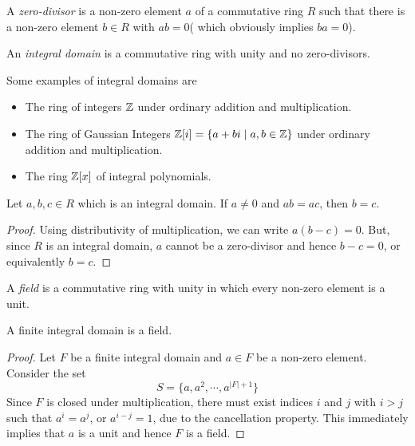 \begin{definition}
	A \textit{zero-divisor} is a non-zero element $a$ of a commutative ring $R$ such that there is a non-zero element $b\in R$ with $ab=0$( which obviously implies $ba=0$).
\end{definition}

\begin{definition}
	An \textit{integral domain} is a commutative ring with unity and no zero-divisors.
\end{definition}

Some examples of integral domains are
\begin{itemize}
	\item The ring of integers $\mathbb{Z}$ under ordinary addition and multiplication.
	\item The ring of Gaussian Integers $\mathbb{Z}[i] = \{a+bi\mid a,b\in\mathbb{Z}\}$ under ordinary addition and multiplication.
	\item The ring $\mathbb{Z}[x]$ of integral polynomials.
\end{itemize}

\begin{proposition}[Cancellation]
	Let $a,b,c\in R$ which is an integral domain. If $a\ne0$ and $ab=ac$, then $b=c$.
\end{proposition}
\begin{proof}
	Using distributivity of multiplication, we can write $a(b-c) = 0$. But, since $R$ is an integral domain, $a$ cannot be a zero-divisor and hence $b-c=0$, or equivalently $b=c$.
\end{proof}

\begin{definition}
	A \textit{field} is a commutative ring with unity in which every non-zero element is a unit.
\end{definition}

\begin{proposition}
	A finite integral domain is a field.
\end{proposition}
\begin{proof}
	Let $F$ be a finite integral domain and $a\in F$ be a non-zero element. Consider the set 
	$$
	S = \{a,a^2,\cdots,a^{|F|+1}\}
	$$
	Since $F$ is closed under multiplication, there must exist indices $i$ and $j$ with $i>j$ such that $a^i = a^j$, or $a^{i-j}=1$, due to the cancellation property. This immediately implies that $a$ is a unit and hence $F$ is a field.
\end{proof}

